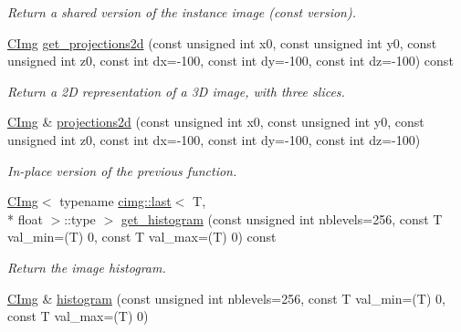 \begin{DoxyCompactItemize}
\begin{DoxyCompactList}\small\item\em Return a shared version of the instance image (const version). \end{DoxyCompactList}\item 
\hypertarget{structcimg__library_1_1_c_img_ab87f88c855c8e9191942a3cc9c8b3db8}{\hyperlink{structcimg__library_1_1_c_img}{C\-Img} \hyperlink{structcimg__library_1_1_c_img_ab87f88c855c8e9191942a3cc9c8b3db8}{get\-\_\-projections2d} (const unsigned int x0, const unsigned int y0, const unsigned int z0, const int dx=-\/100, const int dy=-\/100, const int dz=-\/100) const }\label{structcimg__library_1_1_c_img_ab87f88c855c8e9191942a3cc9c8b3db8}

\begin{DoxyCompactList}\small\item\em Return a 2\-D representation of a 3\-D image, with three slices. \end{DoxyCompactList}\item 
\hypertarget{structcimg__library_1_1_c_img_a1af55bb5241e53c989ee037b6443951b}{\hyperlink{structcimg__library_1_1_c_img}{C\-Img} \& \hyperlink{structcimg__library_1_1_c_img_a1af55bb5241e53c989ee037b6443951b}{projections2d} (const unsigned int x0, const unsigned int y0, const unsigned int z0, const int dx=-\/100, const int dy=-\/100, const int dz=-\/100)}\label{structcimg__library_1_1_c_img_a1af55bb5241e53c989ee037b6443951b}

\begin{DoxyCompactList}\small\item\em In-\/place version of the previous function. \end{DoxyCompactList}\item 
\hyperlink{structcimg__library_1_1_c_img}{C\-Img}$<$ typename \hyperlink{structcimg__library_1_1cimg_1_1last}{cimg\-::last}$<$ T, \\*
float $>$\-::type $>$ \hyperlink{structcimg__library_1_1_c_img_ae6ea8ae7a52aee89eb399b891487dc37}{get\-\_\-histogram} (const unsigned int nblevels=256, const T val\-\_\-min=(T) 0, const T val\-\_\-max=(T) 0) const 
\begin{DoxyCompactList}\small\item\em Return the image histogram. \end{DoxyCompactList}\item 
\hypertarget{structcimg__library_1_1_c_img_a107654a436b31a5612dab76c9c6a4873}{\hyperlink{structcimg__library_1_1_c_img}{C\-Img} \& \hyperlink{structcimg__library_1_1_c_img_a107654a436b31a5612dab76c9c6a4873}{histogram} (const unsigned int nblevels=256, const T val\-\_\-min=(T) 0, const T val\-\_\-max=(T) 0)}\label{structcimg__library_1_1_c_img_a107654a436b31a5612dab76c9c6a4873}


\end{DoxyCompactItemize}
